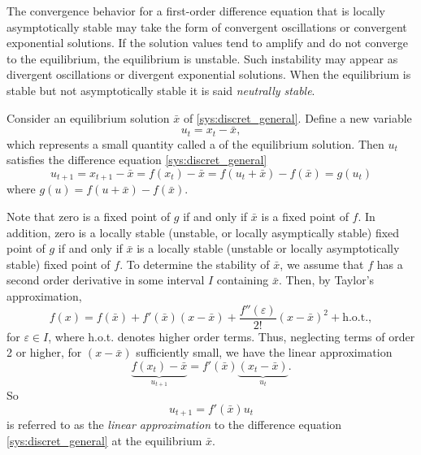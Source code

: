 
The convergence behavior for a first-order difference equation that is locally asymptotically stable may take the form of convergent oscillations or convergent exponential solutions. If the solution values tend to amplify and do not converge to the equilibrium,  the equilibrium is unstable. Such instability may appear as divergent oscillations or divergent exponential solutions. When the equilibrium is stable but not asymptotically stable it is said \emph{neutrally stable}.



\vspace{1cm}
Consider an equilibrium solution $\bar x$ of \eqref{sys:discret_general}. Define a new variable
$$u_{t}=x_t-\bar x,$$
which represents a small quantity called a  of the equilibrium solution. Then $u_t$ satisfies the difference equation \eqref{sys:discret_general}
$$u_{t+1}=x_{t+1}-\bar x=f(x_t)-\bar x=f(u_t+\bar x)-f(\bar x)=g(u_t)$$
where $g(u)=f(u+\bar x)-f(\bar x)$.

Note that zero is a fixed point of $g$ if and only if $\bar x$ is a fixed point of $f$. In addition, zero is a locally stable (unstable, or locally asymptically stable) fixed point of $g$ if and only if $\bar x$ is a locally stable (unstable or locally asymptotically stable) fixed point of $f$. To determine the stability of $\bar x$, we assume that $f$ has a second order derivative in some interval $I$ containing $\bar x$. Then, by Taylor's approximation,
\[
f(x)=f(\bar x)+f'(\bar x)(x-\bar x)+\frac{f''(\varepsilon)}{2!}(x-\bar x)^2+\textrm{h.o.t.},
\]
for $\varepsilon \in I$, where h.o.t. denotes higher order terms. 
Thus, neglecting terms of order 2 or higher, for $(x-\bar x)$ sufficiently small, we have the linear approximation
$$\underbrace{f(x_t)-\bar x}_{u_{t+1}}=f'(\bar x)\underbrace{(x_t-\bar x)}_{u_t}.$$
So
\begin{equation}\label{eq:Linearizatio}
u_{t+1}=f'(\bar x)u_t
\end{equation} is referred to as the \emph{linear approximation} to the difference equation \eqref{sys:discret_general} at the equilibrium $\bar x$.

